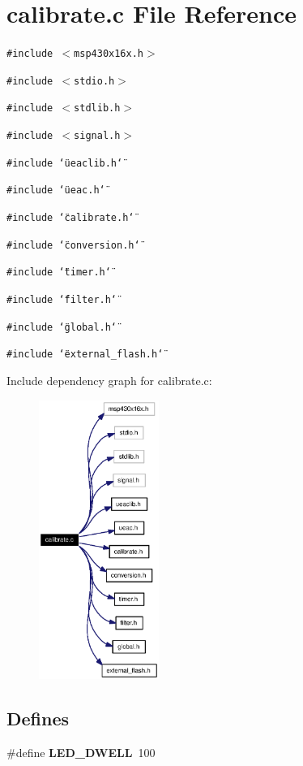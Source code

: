 \section{calibrate.c File Reference}
\label{calibrate_8c}
{\tt \#include $<$msp430x16x.h$>$}\par
{\tt \#include $<$stdio.h$>$}\par
{\tt \#include $<$stdlib.h$>$}\par
{\tt \#include $<$signal.h$>$}\par
{\tt \#include \char`\"{}ueaclib.h\char`\"{}}\par
{\tt \#include \char`\"{}ueac.h\char`\"{}}\par
{\tt \#include \char`\"{}calibrate.h\char`\"{}}\par
{\tt \#include \char`\"{}conversion.h\char`\"{}}\par
{\tt \#include \char`\"{}timer.h\char`\"{}}\par
{\tt \#include \char`\"{}filter.h\char`\"{}}\par
{\tt \#include \char`\"{}global.h\char`\"{}}\par
{\tt \#include \char`\"{}external\_\-flash.h\char`\"{}}\par


Include dependency graph for calibrate.c:\begin{figure}[H]
\begin{center}
\leavevmode
\includegraphics[width=111pt]{calibrate_8c__incl}
\end{center}
\end{figure}
\subsection*{Defines}
\begin{CompactItemize}
\item 
\#define {\bf LED\_\-DWELL}~100
\end{CompactItemize}
